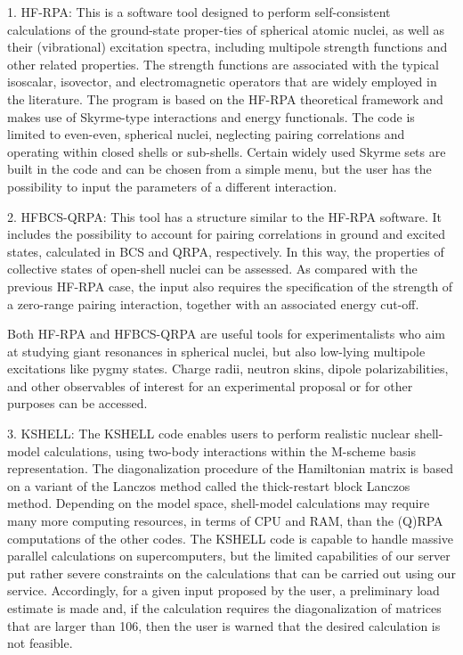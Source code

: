 1. HF-RPA:
This is a software tool designed to perform self-consistent calculations of the ground-state proper-ties of spherical atomic nuclei, as well as their (vibrational) excitation spectra, including multipole strength functions and other related properties. The strength functions are associated with the typical isoscalar, isovector, and electromagnetic operators that are widely employed in the literature. The program is based on the HF-RPA theoretical framework and makes use of Skyrme-type interactions and energy functionals. The code is limited to even-even, spherical nuclei, neglecting pairing correlations and operating within closed shells or sub-shells. Certain widely used Skyrme sets are built in the code and can be chosen from a simple menu, but the user has the possibility to input the parameters of a different interaction.
  
2. HFBCS-QRPA:
This tool has a structure similar to the HF-RPA software. It includes the possibility to account for pairing correlations in ground and excited states, calculated in BCS and QRPA, respectively. In this way, the properties of collective states of open-shell nuclei can be assessed. As compared with the previous HF-RPA case, the input also requires the specification of the strength of a zero-range pairing interaction, together with an associated energy cut-off.

Both HF-RPA and HFBCS-QRPA are useful tools for experimentalists who aim at studying giant resonances in spherical nuclei, but also low-lying multipole excitations like pygmy states. Charge radii, neutron skins, dipole polarizabilities, and other observables of interest for an experimental proposal or for other purposes can be accessed.

3. KSHELL:
The KSHELL code enables users to perform realistic nuclear shell-model calculations, using two-body interactions within the M-scheme basis representation. The diagonalization procedure of the Hamiltonian matrix is based on a variant of the Lanczos method called the thick-restart block Lanczos method. Depending on the model space, shell-model calculations may require many more computing resources, in terms of CPU and RAM, than the (Q)RPA computations of the other codes. The KSHELL code is capable to handle massive parallel calculations on supercomputers, but the limited capabilities of our server put rather severe constraints on the calculations that can be carried out using our service. Accordingly, for a given input proposed by the user, a preliminary load estimate is made and, if the calculation requires the diagonalization of matrices that are larger than 106, then the user is warned that the desired calculation is not feasible.


